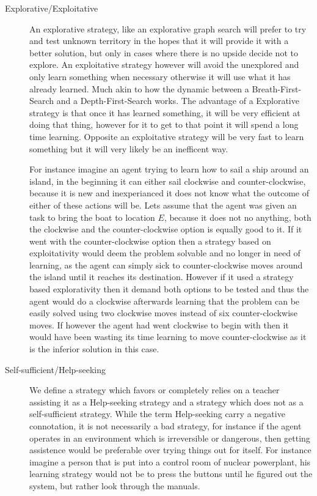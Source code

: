 \documentclass[../Master.tex]{subfiles}
\begin{document}
    \begin{description}
    \item [{Explorative/Exploitative}] An explorative strategy, like an explorative graph search will prefer to try and test unknown territory in the hopes that it will provide it with a better solution, but only in cases where there is no upside decide not to explore.
    An exploitative strategy however will avoid the unexplored and only learn something when necessary otherwise it will use what it has already learned. Much akin to how the dynamic between a Breath-First-Search and a Depth-First-Search works. The advantage of a Explorative strategy is that once it has learned something, it will be very efficient at doing that thing, however for it to get to that point it will spend a long time learning. Opposite an exploitative strategy will be very fast to learn something but it will very likely be an inefficent way.

    For instance imagine an agent trying to learn how to sail a ship around an island, in the beginning it can either sail clockwise and counter-clockwise, because it is new and inexperianced it does not know what the outcome of either of these actions will be. Lets assume that the agent was given an task to bring the boat to location $ E $, because it does not no anything, both the clockwise and the counter-clockwise option is equally good to it. If it went with the counter-clockwise option then a strategy based on exploitativity would deem the problem solvable and no longer in need of learning, as the agent can simply sick to counter-clockwise moves around the island until it reaches its destination. However if it used a strategy based explorativity then it demand both options to be tested and thus the agent would do a clockwise afterwards learning that the problem can be easily solved using two clockwise moves instead of six counter-clockwise moves. If however the agent had went clockwise to begin with then it would have been wasting its time learning to move counter-clockwise as it is the inferior solution in this case.
    \item [{Self-sufficient/Help-seeking}] We define a strategy which favors
    or completely relies on a teacher assisting it as a Help-seeking strategy
    and a strategy which does not as a self-sufficient strategy. While
    the term Help-seeking carry a negative connotation, it is not necessarily
    a bad strategy, for instance if the agent operates in an environment
    which is irreversible or dangerous, then getting assistence would
    be preferable over trying things out for itself. For instance imagine
    a person that is put into a control room of nuclear powerplant, his
    learning strategy would not be to press the buttons until he figured
    out the system, but rather look through the manuals.

    \end{description}
\end{document}
